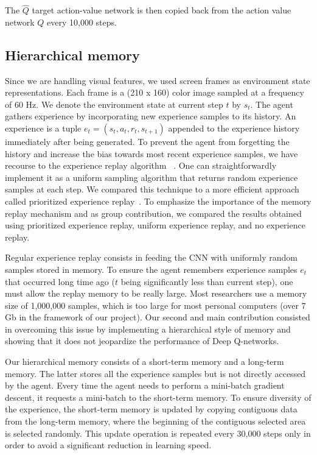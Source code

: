 \documentclass[letterpaper]{article}
\begin{document}
The $\hat Q$ target action-value network is then copied back from the action value network $Q$ every 10,000 steps.

\subsection{Hierarchical memory}

Since we are handling visual features, we used screen frames as environment state representations. Each frame is a (210 x 160) color image sampled at
a frequency of 60 Hz. We denote the environment state at current step $t$ by $s_t$. The agent gathers experience by incorporating new experience samples
to its history. An experience is a tuple $e_t = (s_t, a_t, r_t, s_{t+1})$ appended to the experience history immediately after being generated.
To prevent the agent from forgetting the history and increase the bias towards most recent experience samples, we have recourse to the experience
replay algorithm ~\citep{adam2012experience}. One can straightforwardly implement it as a uniform sampling algorithm that returns random experience samples at each step.
We compared this technique to a more efficient approach called prioritized experience replay~\citep{DBLP:journals/corr/SchaulQAS15}.
To emphasize the importance of the memory replay mechanism and as group contribution, we compared the results obtained using prioritized experience replay, uniform
experience replay, and no experience replay.

Regular experience replay consists in feeding the CNN with uniformly random samples stored in memory. To ensure the agent remembers experience samples $e_t$ that
occurred long time ago ($t$ being significantly less than current step), one must allow the replay memory to be really large. Most researchers use a memory size
of 1,000,000 samples, which is too large for most personal computers (over 7 Gb in the framework of our project). Our second and main contribution consisted in
overcoming this issue by implementing a hierarchical style of memory and showing that it does not jeopardize the performance of Deep Q-networks.

Our hierarchical memory consists of a short-term memory and a long-term memory. The latter stores all the experience samples but is not directly accessed by the agent.
Every time the agent needs to perform a mini-batch gradient descent, it requests a mini-batch to the short-term memory. To ensure diversity of the experience,
the short-term memory is updated by copying contiguous data from the long-term memory, where the beginning of the contiguous selected area is selected randomly.
This update operation is repeated every 30,000 steps only in order to avoid a significant reduction in learning speed.
\end{document}
